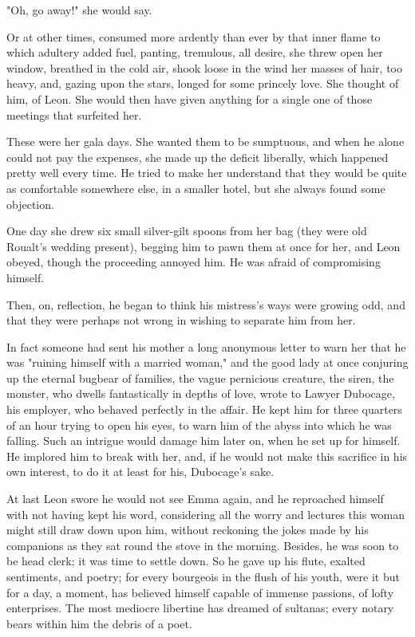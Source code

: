\documentclass{tufte-book}
\begin{document}
"Oh, go away!" she would say.

Or at other times, consumed more ardently than ever by that inner flame
to which adultery added fuel, panting, tremulous, all desire, she threw
open her window, breathed in the cold air, shook loose in the wind her
masses of hair, too heavy, and, gazing upon the stars, longed for some
princely love. She thought of him, of Leon. She would then have given
anything for a single one of those meetings that surfeited her.

These were her gala days. She wanted them to be sumptuous, and when he
alone could not pay the expenses, she made up the deficit liberally,
which happened pretty well every time. He tried to make her understand
that they would be quite as comfortable somewhere else, in a smaller
hotel, but she always found some objection.

One day she drew six small silver-gilt spoons from her bag (they were
old Roualt's wedding present), begging him to pawn them at once for her,
and Leon obeyed, though the proceeding annoyed him. He was afraid of
compromising himself.

Then, on, reflection, he began to think his mistress's ways were growing
odd, and that they were perhaps not wrong in wishing to separate him
from her.

In fact someone had sent his mother a long anonymous letter to warn her
that he was "ruining himself with a married woman," and the good lady at
once conjuring up the eternal bugbear of families, the vague pernicious
creature, the siren, the monster, who dwells fantastically in depths of
love, wrote to Lawyer Dubocage, his employer, who behaved perfectly in
the affair. He kept him for three quarters of an hour trying to open
his eyes, to warn him of the abyss into which he was falling. Such
an intrigue would damage him later on, when he set up for himself. He
implored him to break with her, and, if he would not make this sacrifice
in his own interest, to do it at least for his, Dubocage's sake.

At last Leon swore he would not see Emma again, and he reproached
himself with not having kept his word, considering all the worry and
lectures this woman might still draw down upon him, without reckoning
the jokes made by his companions as they sat round the stove in the
morning. Besides, he was soon to be head clerk; it was time to settle
down. So he gave up his flute, exalted sentiments, and poetry; for every
bourgeois in the flush of his youth, were it but for a day, a moment,
has believed himself capable of immense passions, of lofty enterprises.
The most mediocre libertine has dreamed of sultanas; every notary bears
within him the debris of a poet.
\end{document}
